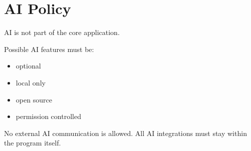 
\chapter{AI Policy}

AI is not part of the core application.

Possible AI features must be:
\begin{itemize}
	\item optional
	\item local only
	\item open source
	\item permission controlled
\end{itemize}
No external AI communication is allowed. All AI integrations must stay within the program itself.

\sentinelchapterend
